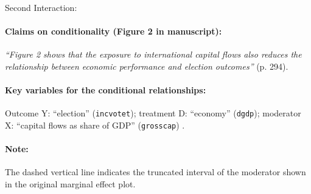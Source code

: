 \documentclass[12pt]{article}
\begin{document}
\noindent Second Interaction:

\paragraph{Claims on conditionality (Figure 2 in manuscript):}
\emph{``Figure 2 shows that the exposure to international capital flows also reduces the relationship between economic performance and election outcomes''} (p. 294).

\paragraph{Key variables for the conditional relationships:} Outcome Y:
``election'' (\texttt{incvotet}); treatment D: ``economy''
(\texttt{dgdp}); moderator X:  ``capital flows as share of GDP'' (\texttt{grosscap}) . 

\paragraph{Note:}  The dashed vertical line indicates the truncated interval of the moderator shown in the original marginal effect plot.
\end{document}
